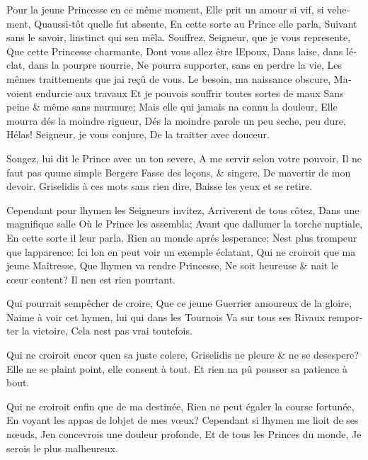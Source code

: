 \documentclass[14pt,a4paper]{memoir}
\begin{document}
{{\begin{otherlanguage}{french}
{Pour la jeune Princesse en ce même moment,} {Elle prit un amour si vif,
si vehement,} {Qu\textquotesingle aussi-tôt qu\textquotesingle elle fut
absente,} {En cette sorte au Prince elle parla,} {Suivant sans le
savoir, l\textquotesingle instinct qui s\textquotesingle en mêla. }
{Souffrez, Seigneur, que je vous represente,} {Que cette Princesse
charmante,} {Dont vous allez être l\textquotesingle Epoux,} {Dans
l\textquotesingle aise, dans l\textquotesingle éclat, dans la pourpre
nourrie,} {Ne pourra supporter, sans en perdre la vie,} {Les mêmes
traittements que j\textquotesingle ai reçû de vous.} {Le besoin, ma
naissance obscure,} {M\textquotesingle avoient endurcie aux travaux} {Et
je pouvois souffrir toutes sortes de maux} {Sans peine \& même sans
murmure;} {Mais elle qui jamais n\textquotesingle a connu la douleur,}
{Elle mourra dés la moindre rigueur,} {Dés la moindre parole un peu
seche, peu dure,} {Hélas! Seigneur, je vous conjure,} {De la traitter
avec douceur.}

{Songez, lui dit le Prince avec un ton severe,} {A me servir selon votre
pouvoir,} {Il ne faut pas qu\textquotesingle une simple Bergere} {Fasse
des leçons, \& s\textquotesingle ingere,} {De m\textquotesingle avertir
de mon devoir.} {Griselidis à ces mots sans rien dire,} {Baisse les yeux
et se retire.}

{Cependant pour l\textquotesingle hymen les Seigneurs invitez,}
{Arriverent de tous côtez,} {Dans une magnifique salle} {Où le Prince
les assembla;} {Avant que d\textquotesingle allumer la torche nuptiale,}
{En cette sorte il leur parla.} {Rien au monde aprés
l\textquotesingle esperance;} {N\textquotesingle est plus trompeur que
l\textquotesingle apparence:} {Ici l\textquotesingle on en peut voir un
exemple éclatant,} {Qui ne croiroit que ma jeune Maîtresse,} {Que
l\textquotesingle hymen va rendre Princesse,} {Ne soit heureuse \&
n\textquotesingle ait le cœur content?} {Il n\textquotesingle en est
rien pourtant.}

{Qui pourrait s\textquotesingle empêcher de croire,} {Que ce jeune
Guerrier amoureux de la gloire,} {N\textquotesingle aime à voir cet
hymen, lui qui dans les Tournois} {Va sur tous ses Rivaux remporter la
victoire,} {Cela n\textquotesingle est pas vrai toutefois.}

{Qui ne croiroit encor qu\textquotesingle en sa juste colere,}
{Griselidis ne pleure \& ne se desespere?} {Elle ne se plaint point,
elle consent à tout.} {Et rien n\textquotesingle a pû pousser sa
patience à bout.}

{Qui ne croiroit enfin que de ma destinée,} {Rien ne peut égaler la
course fortunée,} {En voyant les appas de l\textquotesingle objet de mes
vœux? } {Cependant si l\textquotesingle hymen me lioit de ses nœuds, }
{J\textquotesingle en concevrois une douleur profonde,} {Et de tous les
Princes du monde,} {Je serois le plus malheureux.}


\end{otherlanguage}}}
\end{document}
